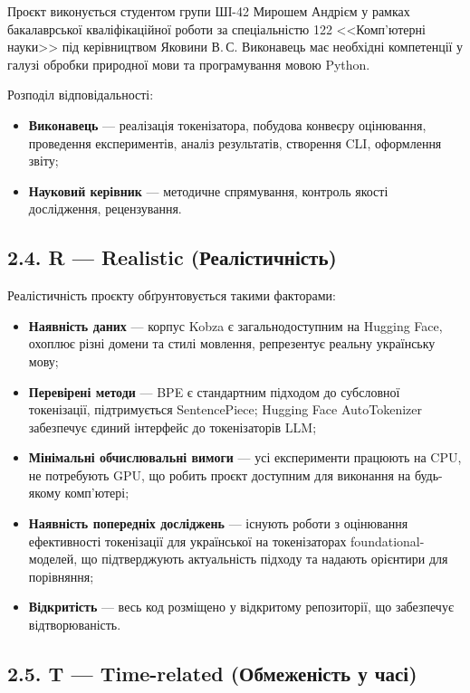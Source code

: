 \documentclass[14pt]{extarticle}
\begin{document}
Проєкт виконується студентом групи ШІ-42 Мирошем Андрієм у рамках бакалаврської кваліфікаційної роботи за спеціальністю 122 <<Комп'ютерні науки>> під керівництвом Яковини В.\,С. Виконавець має необхідні компетенції у галузі обробки природної мови та програмування мовою Python.

Розподіл відповідальності:
\begin{itemize}
  \item \textbf{Виконавець} --- реалізація токенізатора, побудова конвеєру оцінювання, проведення експериментів, аналіз результатів, створення CLI, оформлення звіту;
  \item \textbf{Науковий керівник} --- методичне спрямування, контроль якості дослідження, рецензування.
\end{itemize}

\subsection*{2.4. R --- Realistic (Реалістичність)}

Реалістичність проєкту обґрунтовується такими факторами:
\begin{itemize}
  \item \textbf{Наявність даних} --- корпус Kobza є загальнодоступним на Hugging Face, охоплює різні домени та стилі мовлення, репрезентує реальну українську мову;
  \item \textbf{Перевірені методи} --- BPE є стандартним підходом до субсловної токенізації, підтримується SentencePiece; Hugging Face AutoTokenizer забезпечує єдиний інтерфейс до токенізаторів LLM;
  \item \textbf{Мінімальні обчислювальні вимоги} --- усі експерименти працюють на CPU, не потребують GPU, що робить проєкт доступним для виконання на будь-якому комп'ютері;
  \item \textbf{Наявність попередніх досліджень} --- існують роботи з оцінювання ефективності токенізації для української на токенізаторах foundational-моделей, що підтверджують актуальність підходу та надають орієнтири для порівняння;
  \item \textbf{Відкритість} --- весь код розміщено у відкритому репозиторії, що забезпечує відтворюваність.
\end{itemize}

\subsection*{2.5. T --- Time-related (Обмеженість у часі)}
\end{document}
